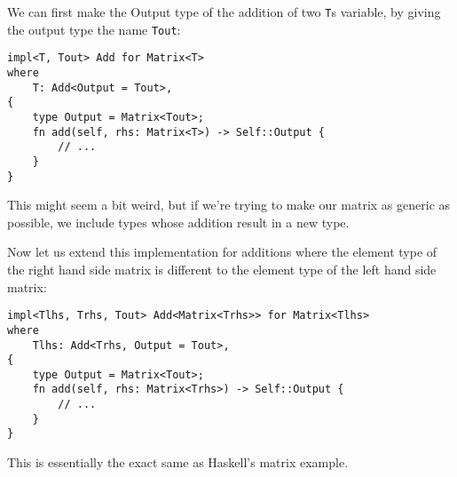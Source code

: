 We can first make the Output type of the addition of two \verb|T|s variable, by giving the output type the name \verb|Tout|:
\begin{verbatim}
impl<T, Tout> Add for Matrix<T>
where
    T: Add<Output = Tout>,
{
    type Output = Matrix<Tout>;
    fn add(self, rhs: Matrix<T>) -> Self::Output {
        // ...
    }
}
\end{verbatim}
This might seem a bit weird, but if we're trying to make our matrix as generic as possible, we include types whose addition result in a new type.

Now let us extend this implementation for additions where the element type of the right hand side matrix is different to the element type of the left hand side matrix:
\begin{verbatim}
impl<Tlhs, Trhs, Tout> Add<Matrix<Trhs>> for Matrix<Tlhs>
where
    Tlhs: Add<Trhs, Output = Tout>,
{
    type Output = Matrix<Tout>;
    fn add(self, rhs: Matrix<Trhs>) -> Self::Output {
        // ...
    }
}
\end{verbatim}
This is essentially the exact same as Haskell's matrix example.






